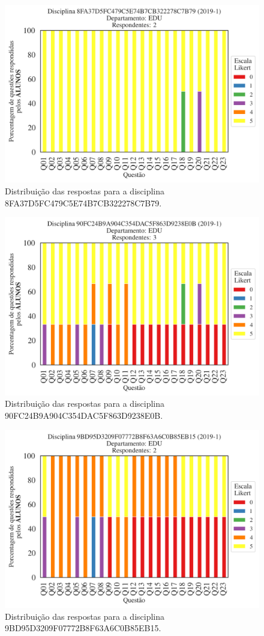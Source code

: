 \documentclass[a4paper,10pt]{article}
\begin{document}
\begin{figure}[h]
\centering
\includegraphics[width=0.485\linewidth]{analise_disciplina_departamento_EDU_ALUNO_TURMA_8FA37D5FC479C5E74B7CB322278C7B79.png}
\caption{\label{fig:analise_geral_departamento}                Distribuição das respostas para a disciplina 8FA37D5FC479C5E74B7CB322278C7B79.}
\end{figure}
\begin{figure}[h]
\centering
\includegraphics[width=0.485\linewidth]{analise_disciplina_departamento_EDU_ALUNO_TURMA_90FC24B9A904C354DAC5F863D9238E0B.png}
\caption{\label{fig:analise_geral_departamento}                Distribuição das respostas para a disciplina 90FC24B9A904C354DAC5F863D9238E0B.}
\end{figure}
\begin{figure}[h]
\centering
\includegraphics[width=0.485\linewidth]{analise_disciplina_departamento_EDU_ALUNO_TURMA_9BD95D3209F07772B8F63A6C0B85EB15.png}
\caption{\label{fig:analise_geral_departamento}                Distribuição das respostas para a disciplina 9BD95D3209F07772B8F63A6C0B85EB15.}
\end{figure}
\end{document}
